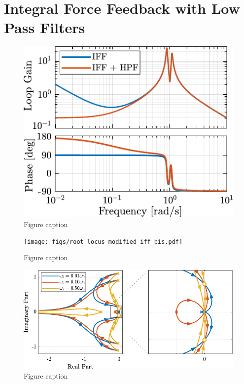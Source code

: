 \documentclass{ISMA_USD2020}
\begin{document}
\section{Integral Force Feedback with Low Pass Filters}
\label{sec:org2985d35}

\begin{figure}[htbp]
\centering
\includegraphics[scale=1]{figs/loop_gain_modified_iff.pdf}
\caption{\label{fig:loop_gain_modified_iff}Figure caption}
\end{figure}

\begin{figure}[htbp]
\centering
\texttt{[image: figs/root\_locus\_modified\_iff\_bis.pdf]}
\caption{\label{fig:root_locus_modified_iff}Figure caption}
\end{figure}

\begin{figure}[htbp]
\centering
\includegraphics[scale=1]{figs/root_locus_wi_modified_iff.pdf}
\caption{\label{fig:root_locus_wi_modified_iff}Figure caption}
\end{figure}
\end{document}
